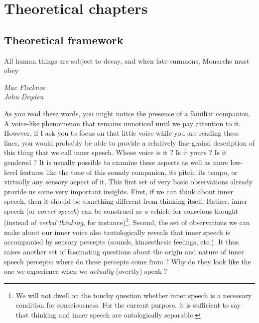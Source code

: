 \documentclass[a4paper,12pt,twoside,openright,oldfontcommands]{memoir}
\let\rmarkdownfootnote\footnote%
\def\footnote{\protect\rmarkdownfootnote}
\newcommand{\initial}[1]{
	\lettrine[lines=3,lhang=0.33,nindent=0em]{
		\color{gray}
     		{\textsc{#1}}}{}}
\begin{document}

\part{Theoretical chapters}\label{part-theoretical-chapters}

\chapter{Theoretical framework}\label{intro}

\epigraph{All human things are subject to decay, and when fate 
summons, Monarchs must obey}{\textit{Mac Flecknoe \\ John Dryden}}

\initial{A}s you read these words, you might notice the presence of a
familiar companion. A voice-like phenomenon that remains unnoticed until
we pay attention to it. However, if I ask you to focus on that little
voice while you are reading these lines, you would probably be able to
provide a relatively fine-graind description of this thing that we call
inner speech. Whose voice is it ? Is it yours ? Is it gendered ? It is
usually possible to examine these aspects as well as more low-level
features like the tone of this soundy companion, its pitch, its tempo,
or virtually any sensory aspect of it. This first set of very basic
observations already provide us some very important insights. First, if
we can think about inner speech, then it should be something different
from thinking itself. Rather, inner speech (or \emph{covert speech}) can
be construed as \emph{a} vehicle for conscious thought (instead of
\emph{verbal thinking}, for instance)\footnote{We will not dwell on the
  touchy question whether inner speech is a necessary condition for
  consciousness. For the current purpose, it is sufficient to say that
  thinking and inner speech are ontologically separable.}. Second, the
set of observations we can make about our inner voice also
tautologically reveals that inner speech is accompanied by sensory
percepts (sounds, kinaesthesic feelings, etc.). It thus raises another
set of fascinating questions about the origin and nature of inner speech
percepts: where do these percepts come from ? Why do they look like the
one we experience when we \emph{actually} (overtly) speak ?
\end{document}

